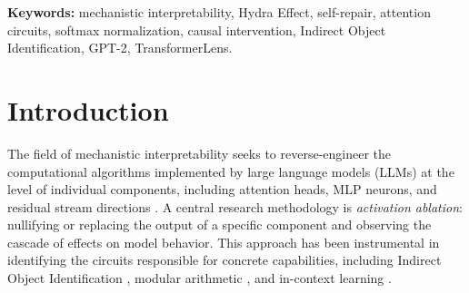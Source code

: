 \documentclass[12pt,a4paper]{article}
\begin{document}
\begin{abstract}
Our principal finding is that in GPT-2 Small on a 200-example mixed-template
IOI cohort, ablating L9H9 and L10H0 induces a robust L10H10 increase in IO-directed
attention. This effect survives zero, mean, and resample ablation controls.
Path-stable FALI/Shapley decomposition shows that the attention increase is
dominated by the IO-target attention-logit contribution, while background-logit
changes oppose the spike on average. QK decomposition suggests the IO-target score
increase is primarily query-driven and largely cosine-alignment-driven.
Output mediation shows that the L10H10 attention-pattern change causally contributes
to IO-S logit recovery under this intervention, explaining about 43.6\% of
L10H10’s zero-ablation degradation by aggregate ratio of means. We keep this
evidence separate from the LayerNorm-scale freezing diagnostic, which shows that under
the Layer-10 clean-scale intervention, 24.3\% of the observed L10H10 attention spike is removed
(reducing L10H10's attention delta from $+0.1893$ to $+0.1433$). While these results provide evidence for target-logit-specific compensatory routing in the GPT-2 Small IOI circuit under L9H9/L10H0 ablation, we bound our claims to this specific architecture, task, and intervention setup. Further work is required to determine whether similar backup mechanisms appear across broader model families and computational benchmarks.
\end{abstract}

\textbf{Keywords:} mechanistic interpretability, Hydra Effect, self-repair,
attention circuits, softmax normalization, causal intervention, Indirect Object
Identification, GPT-2, TransformerLens.

\vspace{1.5em}

\section{Introduction}
\label{sec:intro}

The field of mechanistic interpretability seeks to reverse-engineer the
computational algorithms implemented by large language models (LLMs) at the
level of individual components, including attention heads, MLP neurons, and residual
stream directions \citep{elhage2021mathematical, olah2020zoom}. A central
research methodology is \emph{activation ablation}: nullifying or replacing the
output of a specific component and observing the cascade of effects on model
behavior. This approach has been instrumental in identifying the circuits
responsible for concrete capabilities, including Indirect Object Identification
\citep{wang2022interpretability}, modular arithmetic \citep{nanda2023progress},
and in-context learning \citep{olsson2022context}.
\end{document}
